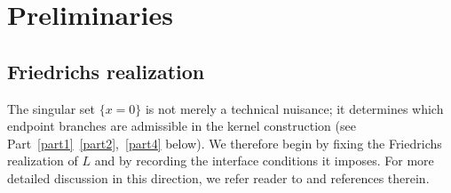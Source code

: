 \documentclass[12pt]{amsart}
\begin{document}









\section{Preliminaries}\label{sec2}





\subsection{Friedrichs realization}\label{ssec:Friedrichs}

The singular set $\{x=0\}$ is not merely a technical nuisance; it determines which endpoint branches are admissible in the kernel construction (see Part~\ref{part1}~\ref{part2},~\ref{part4} below). We therefore begin by fixing the Friedrichs realization of $L$ and by recording the interface conditions it imposes. For more detailed discussion in this direction, we refer reader to \cite{RS_1D,RS_flux} and references therein.

 
\end{document}
